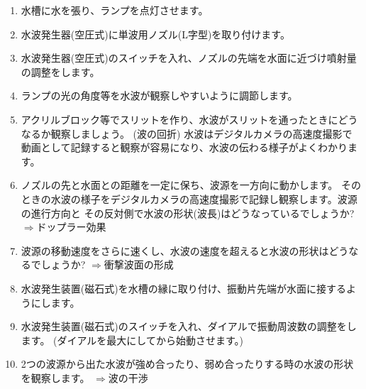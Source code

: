 \begin{enumerate}

\item 水槽に水を張り、ランプを点灯させます。

\item 水波発生器(空圧式)に単波用ノズル(L字型)を取り付けます。

\item 水波発生器(空圧式)のスイッチを入れ、ノズルの先端を水面に近づけ噴射量の調整をします。

\item ランプの光の角度等を水波が観察しやすいように調節します。

\item アクリルブロック等でスリットを作り、水波がスリットを通ったときにどうなるか観察しましょう。
(波の回折) 水波はデジタルカメラの高速度撮影で動画として記録すると観察が容易になり、水波の伝わる様子がよくわかります。

\item ノズルの先と水面との距離を一定に保ち、波源を一方向に動かします。
そのときの水波の様子をデジタルカメラの高速度撮影で記録し観察します。波源の進行方向と
その反対側で水波の形状(波長)はどうなっているでしょうか? $\Rightarrow$ドップラー効果

\item 波源の移動速度をさらに速くし、水波の速度を超えると水波の形状はどうなるでしょうか? $\Rightarrow$衝撃波面の形成

\item 水波発生装置(磁石式)を水槽の縁に取り付け、振動片先端が水面に接するようにします。

\item 水波発生装置(磁石式)のスイッチを入れ、ダイアルで振動周波数の調整をします。
(ダイアルを最大にしてから始動させます。)

\item 2つの波源から出た水波が強め合ったり、弱め合ったりする時の水波の形状を観察します。 $\Rightarrow$波の干渉


\end{enumerate}




